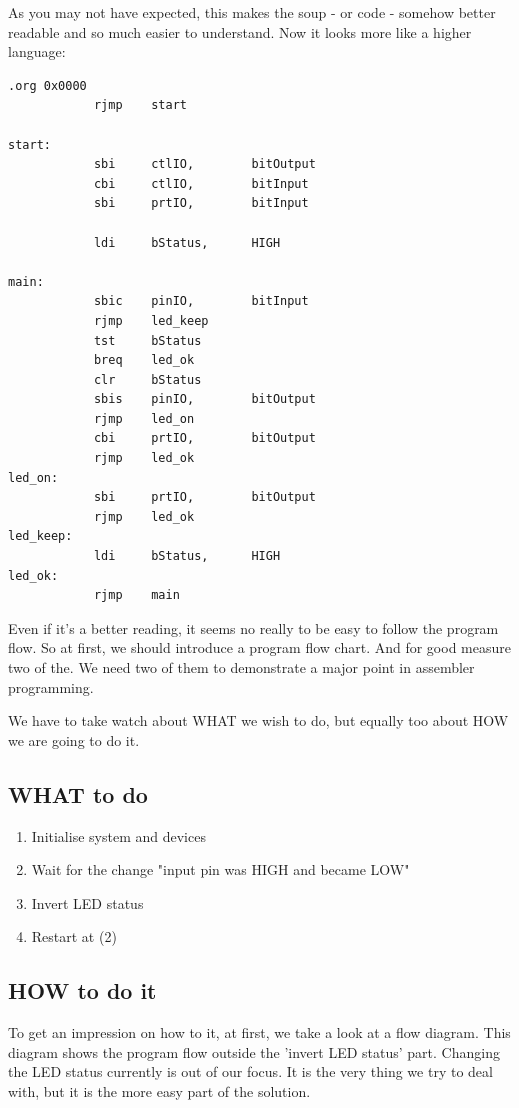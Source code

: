 As you may not have expected, this makes the soup - or code - somehow better readable and so much easier to understand. Now it looks more like a higher language:

\begin{lstlisting}
.org 0x0000
            rjmp    start

start:
            sbi     ctlIO,        bitOutput
            cbi     ctlIO,        bitInput
            sbi     prtIO,        bitInput

            ldi     bStatus,      HIGH

main:
            sbic    pinIO,        bitInput
            rjmp    led_keep
            tst     bStatus
            breq    led_ok
            clr     bStatus
            sbis    pinIO,        bitOutput
            rjmp    led_on
            cbi     prtIO,        bitOutput
            rjmp    led_ok
led_on:
            sbi     prtIO,        bitOutput
            rjmp    led_ok
led_keep:
            ldi     bStatus,      HIGH
led_ok:
            rjmp    main
\end{lstlisting}

Even if it's a better reading, it seems no really to be easy to follow the program flow. So at first, we should introduce a program flow chart. And for good measure two of the. We need two of them to demonstrate a major point in assembler programming.

We have to take watch about WHAT we wish to do, but equally too about HOW we are going to do it.

\subsection{WHAT to do}

\begin{enumerate}
  \item Initialise system and devices
  \item Wait for the change "input pin was HIGH and became LOW"
  \item Invert LED status
  \item Restart at (2)
\end{enumerate}


\subsection{HOW to do it}

To get an impression on how to it, at first, we take a look at a flow diagram. This diagram shows the program flow outside the 'invert LED status' part. Changing the LED status currently is out of our focus. It is the very thing we try to deal with, but it is the more easy part of the solution.

